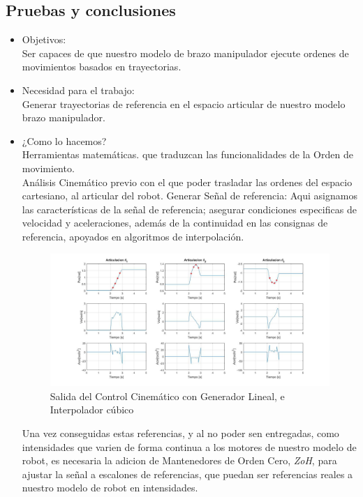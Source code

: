 	\subsection{Pruebas y conclusiones}
	\begin{itemize}
		\item Objetivos: \\
		Ser capaces de que nuestro modelo de brazo manipulador ejecute ordenes de movimientos basados en trayectorias.\\

		\item Necesidad para el trabajo: \\
		Generar trayectorias de referencia en el espacio articular de nuestro modelo brazo manipulador.\\

		\item ¿Como lo hacemos? \\ 
		Herramientas matemáticas. que traduzcan las funcionalidades de la Orden de movimiento. \\ 
		Análisis Cinemático previo con el que poder trasladar las ordenes del espacio cartesiano, al articular del robot.
		Generar Señal de referencia: Aqui asignamos las características de la señal de referencia; asegurar condiciones 
		especificas de velocidad y aceleraciones, además de la continuidad en las consignas de referencia, apoyados en algoritmos
		de interpolación. \\ 

		\begin{figure}[h!]
			\centering
			\includegraphics[width=.7\textwidth]{GeneradorTrayLineal}
			\caption{Salida del Control Cinemático con Generador Lineal, e Interpolador cúbico}
		\end{figure}

		Una vez conseguidas estas referencias, y al no poder sen entregadas, como intensidades que varien de forma continua a los motores
		de nuestro modelo de robot, es necesaria la adicion de Mantenedores de Orden Cero, \textit{ZoH}, para ajustar la señal a escalones
		de referencias, que puedan ser referencias reales a nuestro modelo de robot en intensidades.


\end{itemize}
